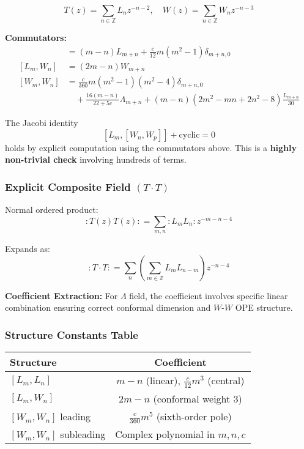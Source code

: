 $$T(z) = \sum_{n \in \mathbb{Z}} L_n z^{-n-2}, \quad W(z) = \sum_{n \in \mathbb{Z}} W_n z^{-n-3}$$

\textbf{Commutators:}
\begin{align}
[L_m, L_n] &= (m-n)L_{m+n} + \frac{c}{12}m(m^2-1)\delta_{m+n,0} \\
[L_m, W_n] &= (2m-n)W_{m+n} \\
[W_m, W_n] &= \frac{c}{360}m(m^2-1)(m^2-4)\delta_{m+n,0} \\
&\quad + \frac{16(m-n)}{22+5c}\Lambda_{m+n} + (m-n)(2m^2 - mn + 2n^2 - 8)\frac{L_{m+n}}{30}
\end{align}

\begin{verification}
The Jacobi identity
$$[L_m, [W_n, W_p]] + \text{cyclic} = 0$$
holds by explicit computation using the commutators above. This is a \textbf{highly non-trivial check} involving hundreds of terms.
\end{verification}

\subsubsection{Explicit Composite Field $(T \cdot T)$}

Normal ordered product:
$$:\!T(z)T(z)\!: = \sum_{m,n} :\!L_m L_n\!: z^{-m-n-4}$$

Expands as:
$$:\!T \cdot T\!: = \sum_{n} \left(\sum_{m \in \mathbb{Z}} L_m L_{n-m}\right) z^{-n-4}$$

\textbf{Coefficient Extraction:} For $\Lambda$ field, the coefficient involves specific linear combination ensuring correct conformal dimension and $W$-$W$ OPE structure.

\subsubsection{Structure Constants Table}

\begin{center}
\begin{tabular}{|l|c|}
\hline
\textbf{Structure} & \textbf{Coefficient} \\
\hline
$[L_m, L_n]$ & $m-n$ (linear), $\frac{c}{12}m^3$ (central) \\
\hline
$[L_m, W_n]$ & $2m-n$ (conformal weight 3) \\
\hline
$[W_m, W_n]$ leading & $\frac{c}{360}m^5$ (sixth-order pole) \\
\hline
$[W_m, W_n]$ subleading & Complex polynomial in $m,n,c$ \\
\hline
\end{tabular}
\end{center}

